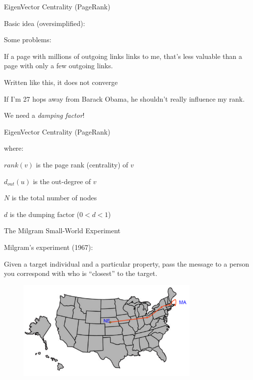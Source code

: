 \begin{frame}{EigenVector Centrality (PageRank)}
	
Basic idea (oversimplified):
\begin{Procedure}
\end{Procedure}


Some problems:
\BI
\item If a page with millions of outgoing links links to me, that’s less valuable than a page with only a few outgoing links.
\item Written like this, it does not converge
\item  If I’m 27 hops away from Barack Obama, he shouldn’t really influence my rank. 
\EI

We need a \emph{damping factor}!

\end{frame}

\begin{frame}{EigenVector Centrality (PageRank)}
\begin{Procedure}
\end{Procedure}
where:
\BI
\item $\mathit{rank}(v)$ is the page rank (centrality) of $v$
\item $d_{\mathit{out}}(u)$ is the out-degree of $v$
\item $N$ is the total number of nodes	
\item $d$ is the dumping factor ($0 < d < 1$)
\EI
\end{frame}

\begin{frame}{The Milgram Small-World Experiment}

Milgram's experiment (1967):

Given a target individual and a particular property, pass the message to a 
person you correspond with who is “closest” to the target.

\begin{figure}
\includegraphics[width=0.8\textwidth]{figs/08/milgram}
\end{figure}
	
\end{frame}

